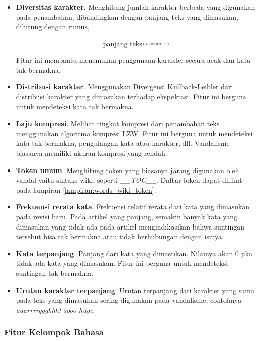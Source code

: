 \begin{itemize}
\item \textbf{Diversitas karakter}.
Menghitung jumlah karakter berbeda yang digunakan pada penambahan, dibandingkan dengan panjang teks yang dimasukan,
dihitung dengan rumus,

\begin{equation}
\text{panjang teks}^{\frac{1}{1+\text{karakter unik}}}
\end{equation}

Fitur ini membantu menemukan penggunaan karakter secara acak dan kata tak
bermakna.

\item \textbf{Distribusi karakter}.
Menggunakan Divergensi Kullback-Leibler dari distribusi karakter yang dimasukan
terhadap ekspektasi.
Fitur ini berguna untuk mendeteksi kata tak bermakna.

\item \textbf{Laju kompresi}.
Melihat tingkat kompresi dari penambahan teks menggunakan algoritma kompresi
LZW.
Fitur ini berguna untuk mendeteksi kata tak bermakna, pengulangan kata atau
karakter, dll.
Vandalisme biasanya memiliki ukuran kompresi yang rendah.

\item \textbf{Token umum}.
Menghitung token yang biasanya jarang digunakan oleh vandal yaitu sintaks
wiki, seperti \textit{\_\_TOC\_\_}. Daftar token dapat dilihat pada lampiran
\ref{lampiran:words_wiki_token}.

\item \textbf{Frekuensi rerata kata}.
Frekuensi relatif rerata dari kata yang dimasukan pada revisi baru.
Pada artikel yang panjang, semakin banyak kata yang dimasukan yang tidak ada
pada artikel mengindikasikan bahwa suntingan tersebut bisa tak bermakna atau
tidak berhubungan dengan isinya.

\item \textbf{Kata terpanjang}.
Panjang dari kata yang dimasukan.
Nilainya akan 0 jika tidak ada kata yang dimasukan.
Fitur ini berguna untuk mendeteksi suntingan tak-bermakna.

\item \textbf{Urutan karakter terpanjang}.
Urutan terpanjang dari karakter yang sama pada teks yang dimasukan sering
digunakan pada vandalisme, contohnya \textit{aaarrrrggghhh! sooo huge}.

\end{itemize}

\subsubsection{Fitur Kelompok Bahasa}


